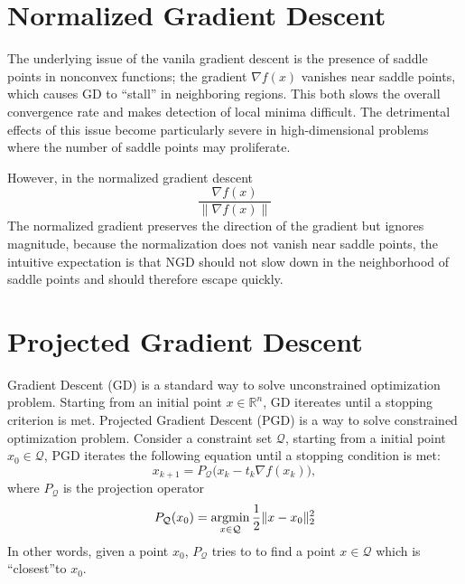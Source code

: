 
\section{Normalized Gradient Descent}

The underlying issue of the vanila gradient descent is the presence of saddle points in nonconvex functions; the gradient $\nabla f(x)$ vanishes near saddle points, which causes GD to ``stall'' in neighboring regions. This both slows the overall convergence rate and makes detection of local minima difficult. The detrimental effects of this issue become particularly severe in high-dimensional problems where the number of saddle points may proliferate.


However, in the normalized gradient descent
$$ \frac{\nabla f(x)}{\|\nabla f(x)\|}$$
The normalized gradient preserves the direction of the gradient but ignores magnitude, because the normalization does not vanish near saddle points, the intuitive expectation is that NGD should not slow down in the neighborhood of saddle points and should therefore escape quickly. 

\section{Projected Gradient Descent}
Gradient Descent (GD) is a standard way to solve unconstrained optimization problem. Starting from an initial point $x\in \mathbb{R}^n$, GD itereates until a stopping criterion is met. Projected Gradient Descent (PGD) is a way to solve constrained optimization problem. Consider a constraint set $\mathcal{Q}$, starting from a initial point $x_0 \in \mathcal{Q}$, PGD iterates the following equation until a stopping condition is met:
$$x_{k+1} = P_\mathcal{Q} \Big(x_k - t_k \nabla f(x_k)\Big),$$
where $P_\mathcal{Q}$ is the projection operator
$$P_\mathcal{Q}(x_0) = \operatorname*{\operatorname{argmin}}_{x\in \mathcal{Q}} \frac{1}{2}\|x-x_0\|^2_2$$
In other words, given a point $x_0$, $P_\mathcal{Q}$ tries to to find a point $x\in \mathcal{Q}$ which is ``closest''to $x_0$.


